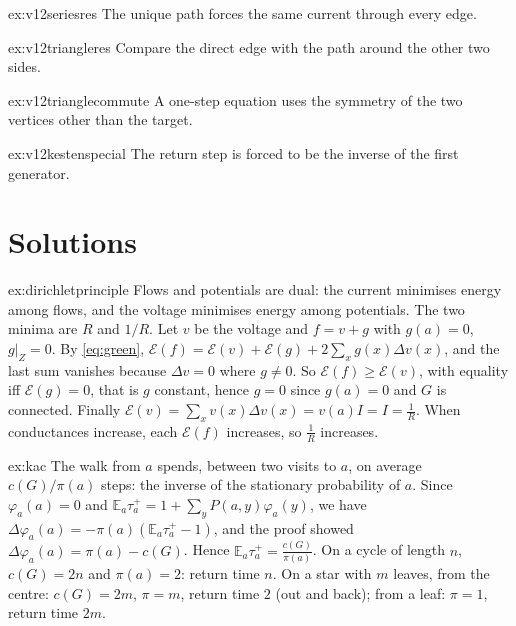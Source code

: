 \begin{hint}{ex:v12seriesres}
The unique path forces the same current through every edge.
\end{hint}

\begin{hint}{ex:v12triangleres}
Compare the direct edge with the path around the other two sides.
\end{hint}

\begin{hint}{ex:v12trianglecommute}
A one-step equation uses the symmetry of the two vertices other than the target.
\end{hint}

\begin{hint}{ex:v12kestenspecial}
The return step is forced to be the inverse of the first generator.
\end{hint}

\section{Solutions}

\begin{solution}{ex:dirichletprinciple}
\idea Flows and potentials are dual: the current minimises energy among flows, and the voltage minimises energy among potentials. The two minima are $R$ and $1/R$.
\writeup Let $v$ be the voltage and $f=v+g$ with $g(a)=0$, $g|_Z=0$. By \eqref{eq:green}, $\mathcal E(f)=\mathcal E(v)+\mathcal E(g)+2\sum_xg(x)\Delta v(x)$, and the last sum vanishes because $\Delta v=0$ where $g\ne0$. So
$\mathcal E(f)\ge\mathcal E(v)$, with equality iff $\mathcal E(g)=0$, that is $g$ constant, hence $g=0$ since $g(a)=0$ and $G$ is connected. Finally $\mathcal E(v)=\sum_xv(x)\Delta v(x)=v(a)I=I=\frac1R$. When conductances increase, each $\mathcal E(f)$
increases, so $\frac1R$ increases.
\end{solution}

\begin{solution}{ex:kac}
\idea The walk from $a$ spends, between two visits to $a$, on average $c(G)/\pi(a)$ steps: the inverse of the stationary probability of $a$.
\writeup Since $\varphi_a(a)=0$ and $\mathbb E_a\tau_a^+=1+\sum_yP(a,y)\varphi_a(y)$, we have $\Delta\varphi_a(a)=-\pi(a)(\mathbb E_a\tau_a^+-1)$, and the proof showed $\Delta\varphi_a(a)=\pi(a)-c(G)$. Hence $\mathbb E_a\tau_a^+=\frac{c(G)}{\pi(a)}$. On a cycle of length $n$,
$c(G)=2n$ and $\pi(a)=2$: return time $n$. On a star with $m$ leaves, from the centre: $c(G)=2m$, $\pi=m$, return time $2$ (out and back); from a leaf: $\pi=1$, return time $2m$.
\end{solution}

